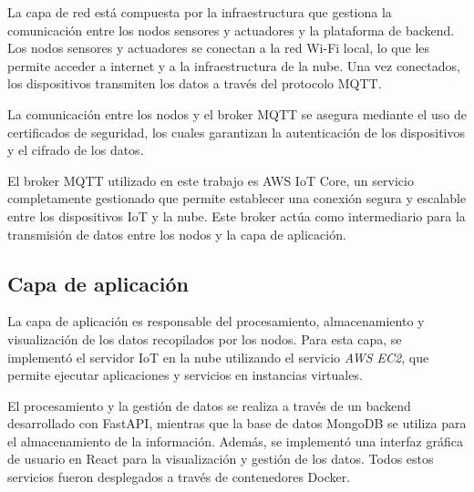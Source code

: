 La capa de red está compuesta por la infraestructura que gestiona la
comunicación entre los nodos sensores y actuadores y la plataforma de backend.
Los nodos sensores y actuadores se conectan a la red Wi-Fi local, lo que les
permite acceder a internet y a la infraestructura de la nube. Una vez
conectados, los dispositivos transmiten los datos a través del protocolo MQTT.

La comunicación entre los nodos y el broker MQTT se asegura mediante el uso de
certificados de seguridad, los cuales garantizan la autenticación de los
dispositivos y el cifrado de los datos.

El broker MQTT utilizado en este trabajo es AWS IoT Core, un servicio
completamente gestionado que permite establecer una conexión segura y escalable
entre los dispositivos IoT y la nube. Este broker actúa como intermediario para
la transmisión de datos entre los nodos y la capa de aplicación.

\subsection{Capa de aplicación}

La capa de aplicación es responsable del procesamiento, almacenamiento y
visualización de los datos recopilados por los nodos. Para esta capa, se
implementó el servidor IoT en la nube utilizando el servicio \textit{AWS EC2},
que permite ejecutar aplicaciones y servicios en instancias virtuales.

El procesamiento y la gestión de datos se realiza a través de un backend
desarrollado con FastAPI, mientras que la base de datos MongoDB se utiliza para
el almacenamiento de la información. Además, se implementó una interfaz gráfica
de usuario en React para la visualización y gestión de los datos. Todos estos
servicios fueron desplegados a través de contenedores Docker.




